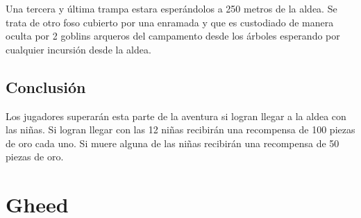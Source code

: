 \documentclass[10pt,twoside,twocolumn,openany]{dndbook}
\begin{document}
Una tercera y última trampa estara esperándolos a 250 metros de la aldea. Se trata de otro foso cubierto por una enramada y que es custodiado de manera oculta por 2 goblins arqueros del campamento desde los árboles esperando por cualquier incursión desde la aldea.

\section{Conclusión}

Los jugadores superarán esta parte de la aventura si logran llegar a la aldea con las niñas. Si logran llegar con las 12 niñas recibirán una recompensa de 100 piezas de oro cada uno. Si muere alguna de las niñas recibirán una recompensa de 50 piezas de oro.

\chapter*{Gheed}


\end{document}
